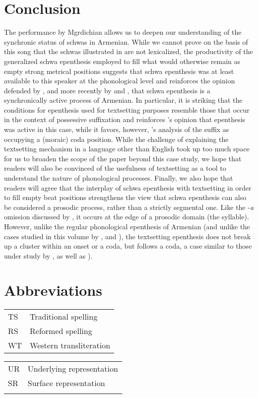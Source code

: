 \documentclass[output=paper,colorlinks,citecolor=brown]{langscibook}
\begin{document}
\section{Conclusion}
The performance by Mgrdichian allows us to deepen our understanding of the synchronic status of schwas in Armenian.  While we cannot prove on the basis of this song that the schwas illustrated in  are not lexicalized, the productivity of the generalized schwa epenthesis employed to fill what would otherwise remain as empty strong metrical positions suggests that schwa epenthesis was at least available to this speaker at the phonological level and reinforces the opinion defended by \citet{Vaux1998}, and more recently by \citet{Baronian2017} and \citet{Dolatian2021}, that schwa epenthesis is a synchronically active process of Armenian.  In particular, it is striking that the conditions for epenthesis used for textsetting purposes resemble those that occur in the context of possessive suffixation and reinforces \citet{Vaux1998}'s opinion that epenthesis was active in this case, while it favors, however, \citet{Baronian2017}'s analysis of the suffix as occupying a (moraic) coda position.  While the challenge of explaining the textsetting mechanism in a language other than English took up too much space for us to broaden the scope of the paper beyond this case study, we hope that readers will also be convinced of the usefulness of textsetting as a tool to understand the nature of phonological processes.  Finally, we also hope that readers will agree that the interplay of schwa epenthesis with textsetting in order to fill empty beat positions strengthens the view that schwa epenthesis can also be considered a prosodic process, rather than a strictly segmental one.  Like the -\textit{a} omission discussed by , it occurs at the edge of a prosodic domain (the syllable).  However, unlike the regular phonological epenthesis of Armenian (and unlike the cases studied in this volume by , and ), the textsetting epenthesis does not break up a cluster within an onset or a coda, but follows a coda, a case similar to those under study by , as well as ).

\section{Abbreviations}
\begin{tabularx}{.45\textwidth}{lQ}
TS & Traditional spelling \\
RS & Reformed spelling \\
WT & Western transliteration \\
\end{tabularx}
\begin{tabularx}{.45\textwidth}{lQ}
UR & Underlying representation \\
SR & Surface representation\\
\\
\end{tabularx}
\end{document}
